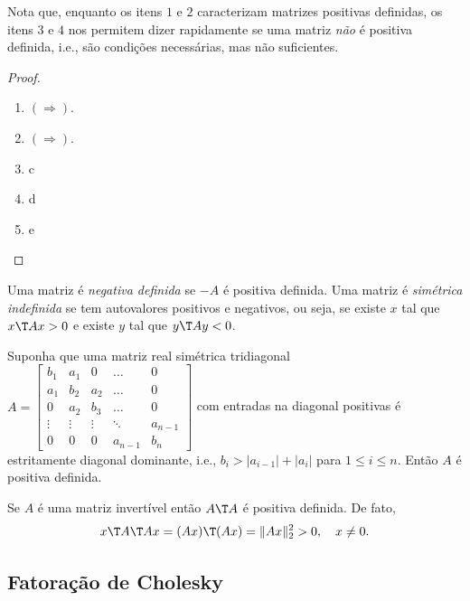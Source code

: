 \documentclass{article}
\begin{document}
Nota que, enquanto os itens \(1\) e \(2\) caracterizam matrizes positivas definidas, os itens \(3\) e \(4\) nos permitem dizer rapidamente se uma matriz \emph{não} é positiva definida, i.e., são condições necessárias, mas não suficientes.

\begin{proof}
    \begin{enumerate}
        \item \((\Rightarrow)\).
        \item \((\Rightarrow)\). 
        \item c
        \item d
        \item e
    \end{enumerate}
\end{proof}

\begin{rem}
    Uma matriz é \emph{negativa definida} se \(-A\) é positiva definida. Uma matriz é \emph{simétrica indefinida} se tem autovalores positivos e negativos, ou seja, se existe \(x\) tal que \(x\T  A x > 0\) e existe \(y\) tal que \(y\T  A y < 0\).
\end{rem}

\begin{thm}
    Suponha que uma matriz real simétrica tridiagonal \(\displaystyle A = \begin{bmatrix}
        b_1 & a_1 & 0 & \ldots & 0 \\
        a_1 & b_2 & a_2 & \ldots & 0 \\
        0 & a_2 & b_3 & \ldots & 0 \\
        \vdots & \vdots & \vdots & \ddots & a_{n-1} \\
        0 & 0 & 0 & a_{n-1} & b_n
    \end{bmatrix}\) com entradas na diagonal positivas é estritamente diagonal dominante, i.e., \(b_i > |a_{i-1}| + |a_i|\) para \(1 \leq i \leq n\). Então \(A\) é positiva definida.
\end{thm}

\begin{rem}
    Se \(A\) é uma matriz invertível então \(A\T  A\) é positiva definida. De fato,
\[
    x\T  A\T  A x = (Ax)\T  (Ax) = \Vert Ax \Vert_2^2 > 0, \quad x \neq 0.
\]
\end{rem}

\subsection{Fatoração de Cholesky}
\end{document}
